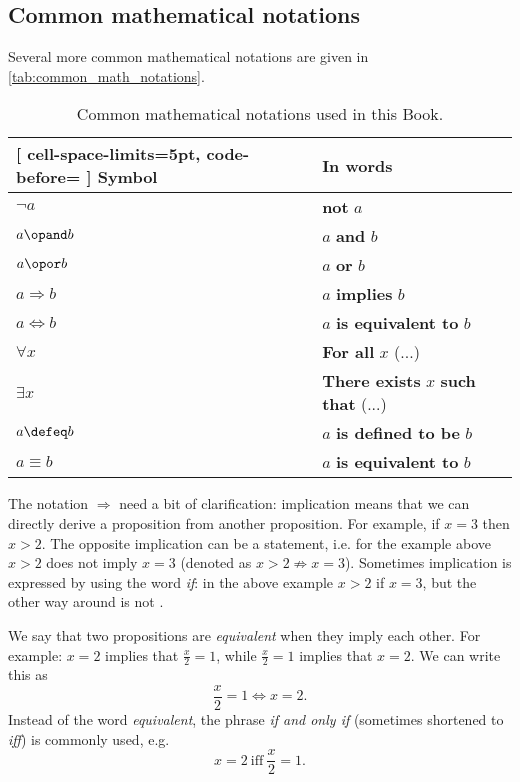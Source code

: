 \subsection{Common mathematical notations}

Several more common mathematical notations are given in \autoref{tab:common_math_notations}.
  
\begin{table}
	\centering
	\caption{Common mathematical notations used in this Book.}
	\label{tab:common_math_notations}
	\begin{NiceTabular}{ll}[
			cell-space-limits=5pt, code-before= 
		]
		\toprule
		\RowStyle[bold=true]{}Symbol & In words\\
		\midrule
		$\neg a$ & \textbf{not} $a$\\
		$a \opand b$ & $a$ \textbf{and} $b$\\
		$a \opor b$ & $a$ \textbf{or} $b$\\
		$a \Rightarrow b$ & $a$ \textbf{implies} $b$\\
		$a \Leftrightarrow b$ & $a$ \textbf{is equivalent to} $b$\\
		$\forall x$ & \textbf{For all} $x$ (...)\\
		$\exists x$ & \textbf{There exists} $x$ \textbf{such that} (...)\\
		$a\defeq b$ & $a$ \textbf{is defined to be} $b$\\
		$a\equiv b$ & $a$ \textbf{is equivalent to} $b$\\
		\midrule
	\end{NiceTabular}
\end{table}

The notation $\Rightarrow$ need a bit of clarification: implication means that we can directly derive a proposition from another proposition. For example, if $x=3$ then $x>2$. The opposite implication can be a \false{} statement, i.e. for the example above $x>2$ does not imply $x=3$ (denoted as $x>2 \nRightarrow x=3$). Sometimes implication is expressed by using the word \textit{if}: in the above example $x>2$ if $x=3$, but the other way around is not \true{}.

We say that two propositions are \emph{equivalent} when they imply each other. For example: $x=2$ implies that $\frac{x}{2}=1$, while $\frac{x}{2}=1$ implies that $x=2$. We can write this as
\[
	\frac{x}{2}=1 \Leftrightarrow x=2.
\]
Instead of the word \textit{equivalent}, the phrase \textit{if and only if} (sometimes shortened to \emph{iff}) is commonly used, e.g.
\[
	x=2\ \text{iff}\ \frac{x}{2}=1.
\]

